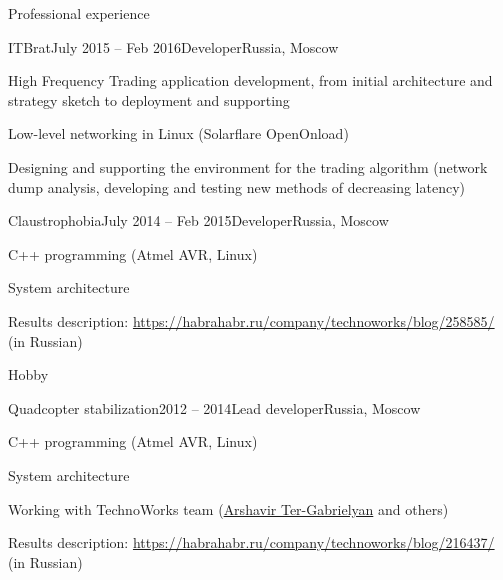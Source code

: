 \documentclass{resume} %
\begin{document}
\begin{rSection}{Professional experience}
\begin{rSubsection}{ITBrat}{July 2015 -- Feb 2016}{Developer}{Russia, Moscow}
	\item High Frequency Trading application development, from initial architecture and strategy sketch to deployment and supporting
	\item Low-level networking in Linux (Solarflare OpenOnload)
	\item Designing and supporting the environment for the trading algorithm (network dump analysis, developing and testing new methods of decreasing latency)
\end{rSubsection}
	
\begin{rSubsection}{Claustrophobia}{July 2014 -- Feb 2015}{Developer}{Russia, Moscow}
	\item C++ programming (Atmel AVR, Linux)
	\item System architecture
	\item Results description: \url{https://habrahabr.ru/company/technoworks/blog/258585/} (in Russian)
\end{rSubsection}
	
	
\end{rSection}

\begin{rSection}{Hobby}
\begin{rSubsection}{Quadcopter stabilization}{2012 -- 2014}{Lead developer}{Russia, Moscow}
\item C++ programming (Atmel AVR, Linux)
\item System architecture
\item Working with TechnoWorks team (\href{http://www.pm.inf.ethz.ch/people/person-detail.html?persid=220074}{Arshavir Ter-Gabrielyan} and others)
\item Results description: \url{https://habrahabr.ru/company/technoworks/blog/216437/} (in Russian)
\end{rSubsection}

\end{rSection}

\end{document}
